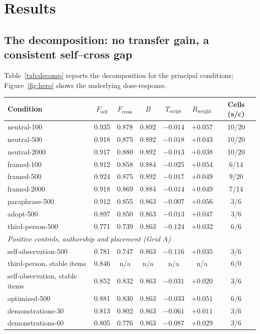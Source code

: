 \documentclass[11pt]{article}
\newcommand{\Fself}{F_{\mathrm{self}}}
\newcommand{\Fcross}{F_{\mathrm{cross}}}
\newcommand{\B}{B}
\newcommand{\Tscript}{T_{\mathrm{script}}}
\newcommand{\Rweight}{R_{\mathrm{weight}}}
\begin{document}
\section{Results}\label{sec:results}
\subsection{The decomposition: no transfer gain, a consistent self--cross gap}
\label{sec:decomp}
Table~\ref{tab:decomp} reports the decomposition for the principal conditions;
Figure~\ref{fig:hero} shows the underlying dose-response.
\begin{table}[!t]
\centering\small
\begin{tabular}{lcccccc}
\toprule
Condition & $\Fself$ & $\Fcross$ & $\B$ & $\Tscript$ & $\Rweight$ & Cells (s/c) \\
\midrule
neutral-100  & 0.935 & 0.878 & 0.892 & $-0.014$ & $+0.057$ & 10/20 \\
neutral-500  & 0.918 & 0.875 & 0.892 & $-0.018$ & $+0.043$ & 10/20 \\
neutral-2000 & 0.917 & 0.880 & 0.892 & $-0.013$ & $+0.038$ & 10/20 \\
framed-100   & 0.912 & 0.858 & 0.884 & $-0.025$ & $+0.054$ & 6/14 \\
framed-500   & 0.924 & 0.875 & 0.892 & $-0.017$ & $+0.049$ & 9/20 \\
framed-2000  & 0.918 & 0.869 & 0.884 & $-0.014$ & $+0.049$ & 7/14 \\
paraphrase-500 & 0.912 & 0.855 & 0.863 & $-0.007$ & $+0.056$ & 3/6 \\
adopt-500    & 0.897 & 0.850 & 0.863 & $-0.013$ & $+0.047$ & 3/6 \\
third-person-500 & 0.771 & 0.739 & 0.863 & $-0.124$ & $+0.032$ & 6/6 \\
\midrule
\multicolumn{7}{l}{\emph{Positive controls, authorship and placement (Grid A)}} \\
self-observation-500 & 0.781 & 0.747 & 0.863 & $-0.116$ & $+0.035$ & 3/6 \\
third-person, stable items & 0.846 & n/a & n/a & n/a & n/a & 6/0 \\
self-observation, stable items & 0.852 & 0.832 & 0.863 & $-0.031$ & $+0.020$ & 3/6 \\
optimized-500 & 0.881 & 0.830 & 0.863 & $-0.033$ & $+0.051$ & 6/6 \\
demonstrations-30 & 0.813 & 0.802 & 0.863 & $-0.061$ & $+0.011$ & 3/6 \\
demonstrations-60 & 0.805 & 0.776 & 0.863 & $-0.087$ & $+0.029$ & 3/6 \\

\end{tabular}
\end{table}
\end{document}
